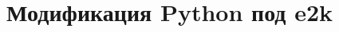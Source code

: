 \chapter{Модификация Python под e2k}
\label{cha:appendix1}

\begin{listing}[H]
\end{listing}
\label{lst:c}


